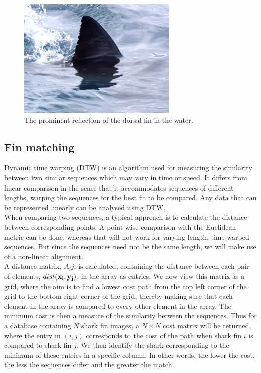 \documentclass[a4paper,10pt]{article}
\begin{document}
\begin{figure}[H]
 \centering
 \includegraphics[width=3in]{reflectfin.jpg}
 \caption{The prominent reflection of the dorsal fin in the water.}
 \label{shadow}
\end{figure}

\subsection{Fin matching}
Dynamic time warping (DTW) is an algorithm used for
measuring the similarity between two similar sequences which may vary in time or
speed.  It differs from linear comparison in the
sense that it accommodates sequences of different lengths, warping the
sequences for the best fit to be compared.
Any data that can be represented linearly can be analysed using DTW.  \\

When comparing two sequences, a typical approach is to calculate the distance
between corresponding points. A point-wise comparison with the Euclidean
metric can be done, whereas that will not work for varying length, time warped sequences.  But since the sequences
need not be the same length, we will make use of a non-linear
alignment. \\

A distance matrix, $A_ij$, is calculated, containing the distance between
each pair of elements,  $dist(\bf{x}_i, \bf{y}_j)$, in the array as entries.
We now view this matrix as a
grid, where the
aim is to find a lowest cost path from the top left corner of the grid to the bottom right
corner of the grid, thereby making sure that each element in the array is compared to every other element in the array.
The minimum cost is then a measure of the similarity between the
sequences.  Thus for a database containing $N$ shark fin images, a $N \times N$ cost
matrix will be returned, where the entry in $(i, j)$ corresponds to the cost
of the path when shark fin $i$ is compared to shark fin $j$.  We then identify the shark
corresponding to the minimum of these entries in a specific
column.
In other words, the lower the cost, the less the sequences differ and the greater the match.  \\
\end{document}
